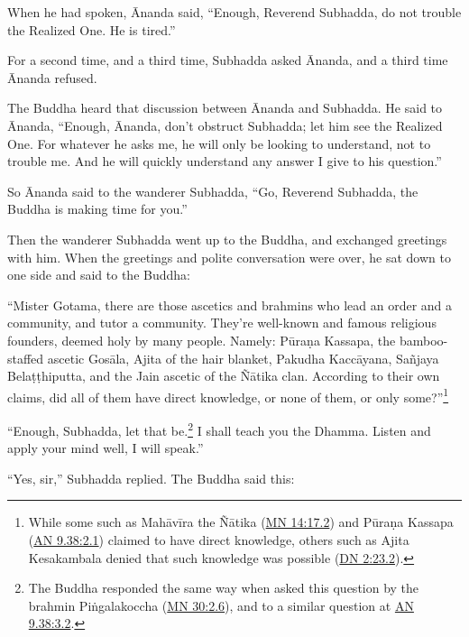 \documentclass[12pt,openany]{book}%
\begin{document}
When he had spoken, Ānanda said, “Enough, Reverend Subhadda, do not trouble the Realized One. He is tired.” 

For a second time, and a third time, Subhadda asked Ānanda, and a third time Ānanda refused. 

The Buddha heard that discussion between Ānanda and Subhadda. He said to Ānanda, “Enough, Ānanda, don’t obstruct Subhadda; let him see the Realized One. For whatever he asks me, he will only be looking to understand, not to trouble me. And he will quickly understand any answer I give to his question.” 

So Ānanda said to the wanderer Subhadda, “Go, Reverend Subhadda, the Buddha is making time for you.” 

Then the wanderer Subhadda went up to the Buddha, and exchanged greetings with him. When the greetings and polite conversation were over, he sat down to one side and said to the Buddha: 

“Mister Gotama, there are those ascetics and brahmins who lead an order and a community, and tutor a community. They’re well-known and famous religious founders, deemed holy by many people. Namely: \textsanskrit{Pūraṇa} Kassapa, the bamboo-staffed ascetic \textsanskrit{Gosāla}, Ajita of the hair blanket, Pakudha \textsanskrit{Kaccāyana}, \textsanskrit{Sañjaya} \textsanskrit{Belaṭṭhiputta}, and the Jain ascetic of the \textsanskrit{Ñātika} clan. According to their own claims, did all of them have direct knowledge, or none of them, or only some?”\footnote{While some such as \textsanskrit{Mahāvīra} the \textsanskrit{Ñātika} (\href{https://suttacentral.net/mn14/en/sujato\#17.2}{MN 14:17.2}) and \textsanskrit{Pūraṇa} Kassapa (\href{https://suttacentral.net/an9.38/en/sujato\#2.1}{AN 9.38:2.1}) claimed to have direct knowledge, others such as Ajita Kesakambala denied that such knowledge was possible (\href{https://suttacentral.net/dn2/en/sujato\#23.2}{DN 2:23.2}). } 

“Enough, Subhadda, let that be.\footnote{The Buddha responded the same way when asked this question by the brahmin \textsanskrit{Piṅgalakoccha} (\href{https://suttacentral.net/mn30/en/sujato\#2.6}{MN 30:2.6}), and to a similar question at \href{https://suttacentral.net/an9.38/en/sujato\#3.2}{AN 9.38:3.2}. } I shall teach you the Dhamma. Listen and apply your mind well, I will speak.” 

“Yes, sir,” Subhadda replied. The Buddha said this: 
\end{document}
